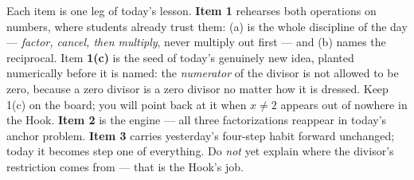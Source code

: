 \documentclass[10pt]{article}
\begin{document}
\begin{teachernote}
Each item is one leg of today's lesson. \textbf{Item 1} rehearses both operations on numbers, where
students already trust them: (a) is the whole discipline of the day --- \emph{factor, cancel, then
multiply}, never multiply out first --- and (b) names the reciprocal. Item \textbf{1(c)} is the seed of
today's genuinely new idea, planted numerically before it is named: the \emph{numerator} of the divisor
is not allowed to be zero, because a zero divisor is a zero divisor no matter how it is dressed.
Keep 1(c) on the board; you will point back at it when $x\neq2$ appears out of nowhere in the Hook.
\textbf{Item 2} is the engine --- all three factorizations reappear in today's anchor problem.
\textbf{Item 3} carries yesterday's four-step habit forward unchanged; today it becomes step one of
everything. Do \emph{not} yet explain where the divisor's restriction comes from --- that is the Hook's
job.
\end{teachernote}
\end{document}
